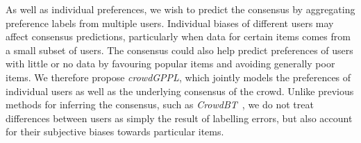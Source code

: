 As well as individual preferences, 
we wish to predict the consensus by aggregating
preference labels from multiple users. 
Individual biases of different users may affect consensus predictions,
particularly when data for certain items comes from a small subset of users.
The consensus could also help
predict preferences of users with little or no data
 by favouring popular items
and avoiding generally poor items.
We therefore propose 
 \emph{crowdGPPL}, which jointly models 
the preferences of individual users as well as the underlying consensus of the crowd.
Unlike previous methods for inferring the consensus, 
such as \emph{CrowdBT}~\citep{chen2013pairwise}, we do not treat differences between users as simply the result of labelling errors, 
but also account for their subjective biases
towards particular items. 
 
